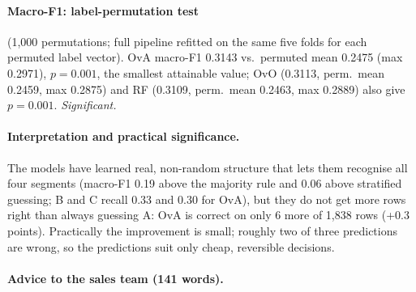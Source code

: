 \documentclass[11pt]{article}
\begin{document}
\paragraph{Macro-F1: label-permutation test} (1{,}000 permutations; full pipeline refitted on the same
five folds for each permuted label vector). OvA macro-F1 0.3143 vs.\ permuted mean 0.2475 (max 0.2971),
\textbf{$p=0.001$}, the smallest attainable value; OvO (0.3113, perm.\ mean 0.2459, max 0.2875) and RF
(0.3109, perm.\ mean 0.2463, max 0.2889) also give $p=0.001$. \emph{Significant.}

\paragraph{Interpretation and practical significance.} The models have learned real, non-random
structure that lets them recognise all four segments (macro-F1 0.19 above the majority rule and 0.06
above stratified guessing; B and C recall 0.33 and 0.30 for OvA), but they do not get more rows right
than always guessing A: OvA is correct on only 6 more of 1{,}838 rows (+0.3 points). Practically the
improvement is small; roughly two of three predictions are wrong, so the predictions suit only cheap,
reversible decisions.

\paragraph{Advice to the sales team (141 words).}\leavevmode
\begin{center}
\end{center}
\end{document}
